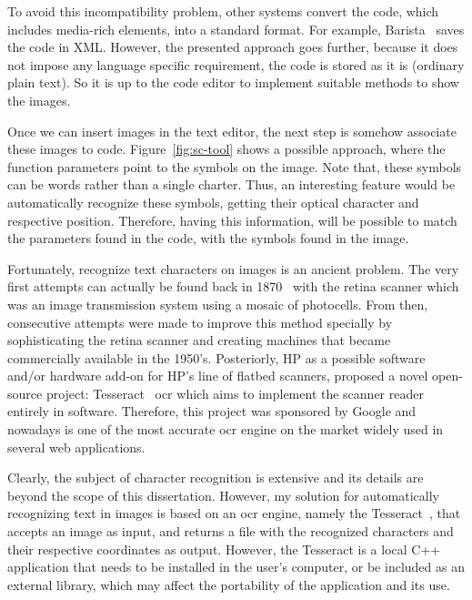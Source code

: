To avoid this incompatibility problem, other systems convert the code, which includes media-rich elements, into a standard format. For example, Barista~\citep{ko2006barista} saves the code in XML. However, the presented approach goes further, because it does not impose any language specific requirement, the code is stored as it is (ordinary plain text). So it is up to the code editor to implement suitable methods to show the images.

Once we can insert images in the text editor, the next step is somehow associate these images to code. Figure~\ref{fig:sc-tool} shows a possible approach, where the function parameters point to the symbols on the image. Note that, these symbols can be words rather than a single charter. Thus, an interesting feature would be automatically recognize these symbols, getting their optical character and respective position. Therefore, having this information, will be possible to match the parameters found in the code, with the symbols found in the image.

Fortunately, recognize text characters on images is an ancient problem. The very first attempts can actually be found back in 1870~\citep{eikvil1993optical} with the retina scanner which was an image transmission system using a mosaic of photocells. From then, consecutive attempts were made to improve this method specially by sophisticating the retina scanner and creating machines that became commercially available in the 1950's. Posteriorly, HP as a possible software and/or hardware add-on for HP's line of flatbed scanners, proposed a novel open-source project: Tesseract~\citep{smith2007overview} \gls{ocr} which aims to implement the scanner reader entirely in software. Therefore, this project was sponsored by Google and nowadays is one of the most accurate \gls{ocr} engine on the market widely used in several web applications.

Clearly, the subject of character recognition is extensive and its details are beyond the scope of this dissertation. However, my solution for automatically recognizing text in images is based on an \gls{ocr} engine, namely the Tesseract~\citep{smith2007overview}, that accepts an image as input, and returns a file with the recognized characters and their respective coordinates as output. However, the Tesseract is a local C++ application that needs to be installed in the user's computer, or be included as an external library, which may affect the portability of the application and its use.

